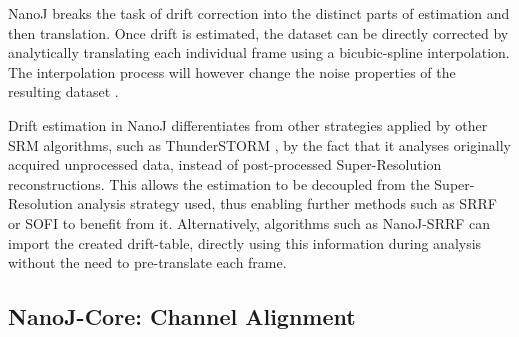  NanoJ breaks the task of drift correction into the distinct parts of estimation and then translation. Once drift is estimated, the dataset can be directly corrected by analytically translating each individual frame using a bicubic-spline interpolation. The interpolation process will however change the noise properties of the resulting dataset \cite{blaysat2016effect}.

 Drift estimation in NanoJ differentiates from other strategies applied by other SRM algorithms, such as ThunderSTORM \cite{ovesny2014thunderstorm}, by the fact that it analyses originally acquired unprocessed data, instead of post-processed Super-Resolution reconstructions. This allows the estimation to be decoupled from the Super-Resolution analysis strategy used, thus enabling further methods such as SRRF or SOFI \cite{dertinger2009fast} to benefit from it. Alternatively, algorithms such as NanoJ-SRRF can import the created drift-table, directly using this information during analysis without the need to pre-translate each frame.   

\subsection*{NanoJ-Core: Channel Alignment}


